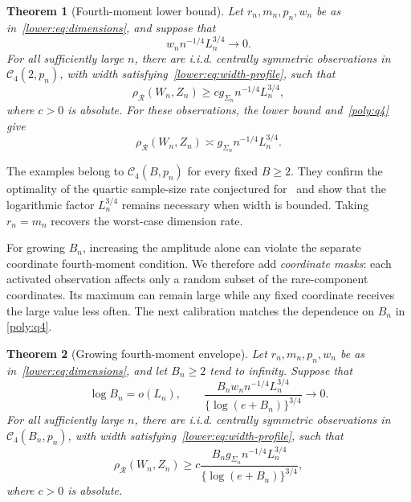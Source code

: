 \documentclass[11pt,letterpaper,twoside,leqno]{article}
\theoremstyle{bookplain}
\newtheorem{theorem}{Theorem}
\theoremstyle{bookremark}
\newcommand{\rh}{\rho_{\mathcal R}}
\begin{document}
\begin{theorem}[Fourth-moment lower bound]\label{opt:q4-lower}
Let \(r_n,m_n,p_n,w_n\) be as in~\eqref{lower:eq:dimensions},
and suppose that
\[
 w_n n^{-1/4}L_n^{3/4}\longrightarrow0.
\]
For all sufficiently large \(n\), there are i.i.d. centrally
symmetric observations in \(\mathcal C_4(2,p_n)\), with width
satisfying~\eqref{lower:eq:width-profile}, such that
\begin{equation}
 \rh(W_n,Z_n)\ge c g_{\Sigma_n}n^{-1/4}L_n^{3/4},
 \label{opt:eq:q4-lower}
\end{equation}
where \(c>0\) is absolute. For these observations, the lower bound
and~\eqref{poly:q4} give
\begin{equation}
 \rh(W_n,Z_n)\asymp g_{\Sigma_n}n^{-1/4}L_n^{3/4}.
 \label{lower:q4-fixed}
\end{equation}
\end{theorem}

The examples belong to $\mathcal C_4(B,p_n)$ for every fixed
$B\ge2$. They confirm the optimality of the quartic sample-size
rate conjectured for~\cite[Theorem~2.5]{CCKK2022} and show that
the logarithmic factor $L_n^{3/4}$ remains necessary when width
is bounded. Taking $r_n=m_n$ recovers the worst-case dimension
rate.

For growing $B_n$, increasing the amplitude alone can violate the
separate coordinate fourth-moment condition. We therefore add
\emph{coordinate masks}: each activated observation affects only a random
subset of the rare-component coordinates. Its maximum can remain
large while any fixed coordinate receives the large value less
often. The next calibration matches the dependence on $B_n$ in
\eqref{poly:q4}.

\begin{theorem}[Growing fourth-moment envelope]\label{opt:q4-growing}
Let \(r_n,m_n,p_n,w_n\) be as in~\eqref{lower:eq:dimensions},
and let \(B_n\ge2\) tend to infinity. Suppose that
\[
 \log B_n=o(L_n),\qquad
 \frac{B_n w_n n^{-1/4}L_n^{3/4}}
 {\{\log(e+B_n)\}^{3/4}}\longrightarrow0.
\]
For all sufficiently large \(n\), there are i.i.d. centrally
symmetric observations in \(\mathcal C_4(B_n,p_n)\), with width
satisfying~\eqref{lower:eq:width-profile}, such that
\begin{equation}
 \rh(W_n,Z_n)\ge
 c\frac{B_n g_{\Sigma_n}n^{-1/4}L_n^{3/4}}
 {\{\log(e+B_n)\}^{3/4}},
 \label{opt:eq:q4-growing}
\end{equation}
where \(c>0\) is absolute.
\end{theorem}
\end{document}
